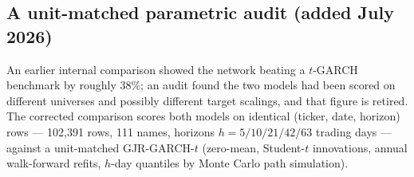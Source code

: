 %


\subsection{A unit-matched parametric audit (added July 2026)}
\label{sec:samerows}

An earlier internal comparison showed the network beating a $t$-GARCH
benchmark by roughly 38\%; an audit found the two models had been scored
on different universes and possibly different target scalings, and that
figure is retired. The corrected comparison scores both models on
identical (ticker, date, horizon) rows --- 102{,}391 rows, 111 names,
horizons $h = 5/10/21/42/63$ trading days --- against a unit-matched
GJR-GARCH-$t$ (zero-mean, Student-$t$ innovations, annual walk-forward
refits, $h$-day quantiles by Monte Carlo path simulation).

